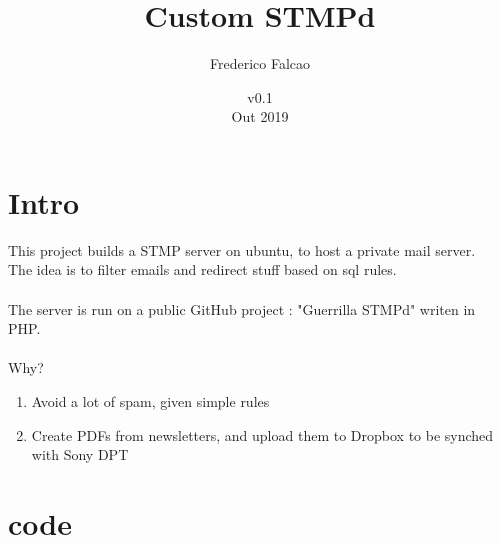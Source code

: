 \documentclass[12pt]{article}
\begin{document}
\title{Custom STMPd}
\author{Frederico Falcao}
\date{v0.1 \\ Out 2019}
\maketitle

\newpage
\section{Intro}
This project builds a STMP server on ubuntu, to host a private mail server. \\
The idea is to filter emails and redirect stuff based on sql rules.\\
\\
The server is run on a public GitHub project : "Guerrilla STMPd" writen in PHP. \\
\\
Why?
\begin{enumerate}
\item Avoid a lot of spam, given simple rules
\item Create PDFs from newsletters, and upload them to Dropbox to be synched with Sony DPT
\end{enumerate}




\newpage
\section{code}

\end{document}
